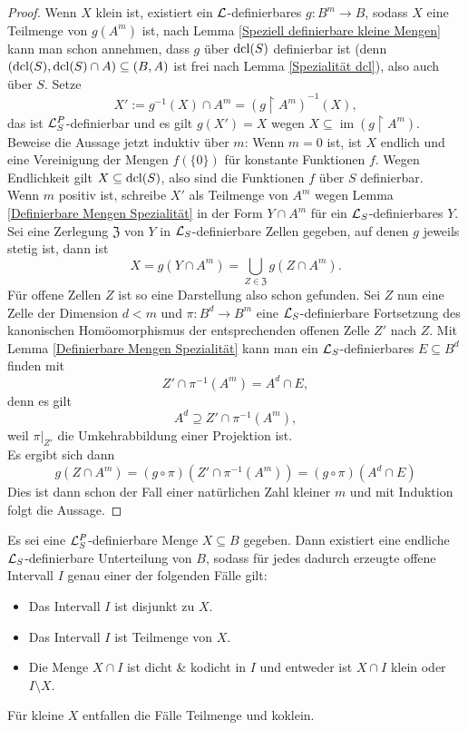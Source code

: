 \begin{proof}
	Wenn $X$ klein ist, existiert ein $\mathcal{L}$-definierbares $g:B^m\rightarrow B$, sodass $X$ eine Teilmenge von $g(A^m)$ ist, nach Lemma \ref{Speziell definierbare kleine Mengen} kann man schon annehmen, dass $g$ über $\operatorname{dcl}(S)$ definierbar ist (denn $(\operatorname{dcl}(S),\operatorname{dcl}(S)\cap A)\subseteq (B,A)$ ist frei nach Lemma \ref{Spezialität dcl}), also auch über $S$. Setze $$X':=g^{-1}(X)\cap A^m=(g\upharpoonright A^m)^{-1}(X),$$ das ist $\mathcal{L}^P_S$-definierbar und es gilt $g(X')=X$ wegen $X\subseteq\operatorname{im}(g\upharpoonright A^m)$.\\
	Beweise die Aussage jetzt induktiv über $m$: Wenn $m=0$ ist, ist $X$ endlich und eine Vereinigung der Mengen $f(\{0\})$ für konstante Funktionen $f$. Wegen Endlichkeit gilt $X\subseteq\operatorname{dcl}(S)$, also sind die Funktionen $f$ über $S$ definierbar.\\
	Wenn $m$ positiv ist, schreibe $X'$ als Teilmenge von $A^m$ wegen Lemma \ref{Definierbare Mengen Spezialität} in der Form $Y\cap A^m$ für ein $\mathcal{L}_S$-definierbares $Y$. Sei eine Zerlegung $\mathfrak{Z}$ von $Y$ in $\mathcal{L}_S$-definierbare Zellen gegeben, auf denen $g$ jeweils stetig ist, dann ist $$X=g(Y\cap A^m)=\bigcup\limits_{Z\in\mathfrak{Z}}g(Z\cap A^m).$$
	Für offene Zellen $Z$ ist so eine Darstellung also schon gefunden. Sei $Z$ nun eine Zelle der Dimension $d<m$ und $\pi:B^d\rightarrow B^m$ eine $\mathcal{L}_S$-definierbare Fortsetzung des kanonischen Homöomorphismus der entsprechenden offenen Zelle $Z'$ nach $Z$. Mit Lemma \ref{Definierbare Mengen Spezialität} kann man ein $\mathcal{L}_S$-definierbares $E\subseteq B^d$ finden mit $$Z'\cap\pi^{-1}(A^m)=A^d\cap E,$$ denn es gilt $$A^d\supseteq Z'\cap\pi^{-1}(A^m),$$ weil $\pi|_{Z'}$ die Umkehrabbildung einer Projektion ist.\\
	Es ergibt sich dann
	$$g(Z\cap A^m)=(g\circ\pi)(Z'\cap\pi^{-1}(A^m))=(g\circ\pi)(A^d\cap E)$$
	Dies ist dann schon der Fall einer natürlichen Zahl kleiner $m$ und mit Induktion folgt die Aussage.
\end{proof}
\newpage
\begin{theorem}\label{Satz 4}
	Es sei eine $\mathcal{L}^P_S$-definierbare Menge $X\subseteq B$ gegeben. Dann existiert eine endliche $\mathcal{L}_S$-definierbare Unterteilung von $B$, sodass für jedes dadurch erzeugte offene Intervall $I$ genau einer der folgenden Fälle gilt:
	\begin{itemize}
		\item Das Intervall $I$ ist disjunkt zu $X$.
		\item Das Intervall $I$ ist Teilmenge von $X$.
		\item Die Menge $X\cap I$ ist dicht \& kodicht in $I$ und entweder ist $X\cap I$ klein oder $I\setminus X$.
	\end{itemize}
	Für kleine $X$ entfallen die Fälle \glqq{}Teilmenge\grqq{} und \glqq{}koklein\grqq{}.
\end{theorem}
